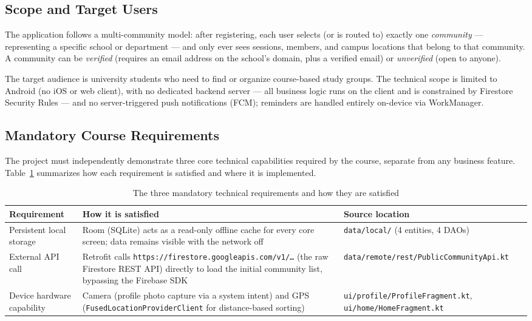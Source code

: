 \subsection{Scope and Target Users}

The application follows a multi-community model: after registering, each user selects (or is routed to) exactly one \emph{community} — representing a specific school or department — and only ever sees sessions, members, and campus locations that belong to that community. A community can be \emph{verified} (requires an email address on the school's domain, plus a verified email) or \emph{unverified} (open to anyone).

The target audience is university students who need to find or organize course-based study groups. The technical scope is limited to Android (no iOS or web client), with no dedicated backend server — all business logic runs on the client and is constrained by Firestore Security Rules — and no server-triggered push notifications (FCM); reminders are handled entirely on-device via WorkManager.

\subsection{Mandatory Course Requirements}
\label{sec:coursereq}

The project must independently demonstrate three core technical capabilities required by the course, separate from any business feature. Table~\ref{tab:coursereq} summarizes how each requirement is satisfied and where it is implemented.

\begin{table}[h]
\centering
\caption{The three mandatory technical requirements and how they are satisfied}
\label{tab:coursereq}
\begin{tabular}{p{3.2cm}p{6cm}p{4cm}}
\toprule
\textbf{Requirement} & \textbf{How it is satisfied} & \textbf{Source location} \\
\midrule
Persistent local storage & Room (SQLite) acts as a read-only offline cache for every core screen; data remains visible with the network off & \texttt{data/local/} (4 entities, 4 DAOs) \\
\addlinespace
External API call & Retrofit calls \texttt{https://firestore.\allowbreak googleapis.com/v1/\ldots} (the raw Firestore REST API) directly to load the initial community list, bypassing the Firebase SDK & \texttt{data/remote/rest/PublicCommunityApi.kt} \\
\addlinespace
Device hardware capability & Camera (profile photo capture via a system intent) and GPS (\texttt{FusedLocationProviderClient} for distance-based sorting) & \texttt{ui/profile/ProfileFragment.kt}, \texttt{ui/home/HomeFragment.kt} \\
\bottomrule
\end{tabular}
\end{table}

